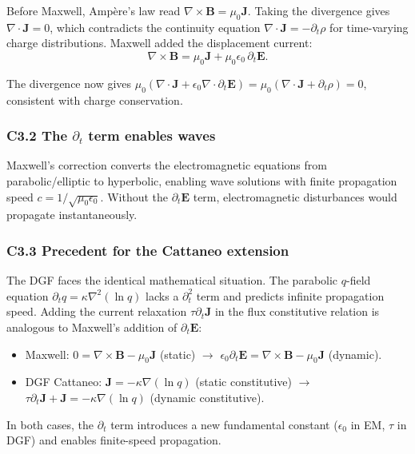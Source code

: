 \documentclass[reprint]{revtex4-2}
\begin{document}
Before Maxwell, Amp\`ere's law read $\nabla\times\mathbf{B} = \mu_0\mathbf{J}$. Taking the divergence gives $\nabla\cdot\mathbf{J}=0$, which contradicts the continuity equation $\nabla\cdot\mathbf{J} = -\partial_t\rho$ for time-varying charge distributions. Maxwell added the displacement current:
\begin{equation}
\nabla\times\mathbf{B} = \mu_0\mathbf{J} + \mu_0\epsilon_0\,\partial_t\mathbf{E}.
\end{equation}

The divergence now gives $\mu_0(\nabla\cdot\mathbf{J} + \epsilon_0\nabla\cdot\partial_t\mathbf{E}) = \mu_0(\nabla\cdot\mathbf{J} + \partial_t\rho) = 0$, consistent with charge conservation.

\subsubsection{C3.2 The $\partial_t$ term enables waves}

Maxwell's correction converts the electromagnetic equations from parabolic/elliptic to hyperbolic, enabling wave solutions with finite propagation speed $c = 1/\sqrt{\mu_0\epsilon_0}$. Without the $\partial_t\mathbf{E}$ term, electromagnetic disturbances would propagate instantaneously.

\subsubsection{C3.3 Precedent for the Cattaneo extension}

The DGF faces the identical mathematical situation. The parabolic $q$-field equation $\partial_t q = \kappa\nabla^2(\ln q)$ lacks a $\partial_t^2$ term and predicts infinite propagation speed. Adding the current relaxation $\tau\partial_t\mathbf{J}$ in the flux constitutive relation is analogous to Maxwell's addition of $\partial_t\mathbf{E}$:
\begin{itemize}
\item Maxwell: $0 = \nabla\times\mathbf{B} - \mu_0\mathbf{J}$ (static) $\to$ $\epsilon_0\partial_t\mathbf{E} = \nabla\times\mathbf{B} - \mu_0\mathbf{J}$ (dynamic).
\item DGF Cattaneo: $\mathbf{J} = -\kappa\nabla(\ln q)$ (static constitutive) $\to$ $\tau\partial_t\mathbf{J} + \mathbf{J} = -\kappa\nabla(\ln q)$ (dynamic constitutive).
\end{itemize}

In both cases, the $\partial_t$ term introduces a new fundamental constant ($\epsilon_0$ in EM, $\tau$ in DGF) and enables finite-speed propagation.
\end{document}
